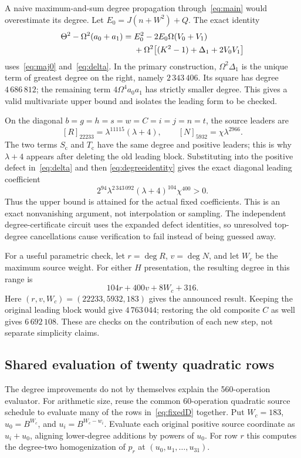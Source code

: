 \documentclass[11pt]{article}
\newcommand{\Sc}{S_{\mathrm c}}
\newcommand{\Tc}{T_{\mathrm c}}
\theoremstyle{remark}\newtheorem{remark}[theorem]{Remark}
\begin{document}
A naive maximum-and-sum degree propagation through~\eqref{eq:main}
would overestimate its degree. Let
$E_0=J(n+W^2)+Q$. The exact identity
\begin{align}
 \Theta^2-\Omega^2(a_0+a_1)
 ={}&E_0^2-2E_0\Omega(V_0+V_1)\notag\\
 &+\Omega^2\bigl[(K^2-1)+\Delta_1+2V_0V_1\bigr]\label{eq:degreeidentity}
\end{align}
uses~\eqref{eq:maj0} and~\eqref{eq:delta}. In the primary construction,
$\Omega^2\Delta_1$ is the unique term of greatest degree on the right,
namely $2\,343\,406$. Its square has degree $4\,686\,812$; the remaining
term $4\Omega^4a_0a_1$ has strictly smaller degree. This gives a valid
multivariate upper bound and isolates the leading form to be checked.

On the diagonal $b=g=h=s=w=C=i=j=n=t$, the source leaders are
\[
 [R]_{22233}=\lambda^{11115}(\lambda+4),\qquad
 [N]_{5932}=\chi\lambda^{2966}.
\]
The two terms $\Sc$ and $\Tc$ have the same degree and positive leaders;
this is why $\lambda+4$ appears after deleting the old leading block.
Substituting into the positive defect in~\eqref{eq:delta} and then
\eqref{eq:degreeidentity} gives the exact diagonal leading coefficient
\begin{equation}\label{eq:leader}
 \boxed{\quad
 2^{94}\lambda^{2\,343\,092}(\lambda+4)^{104}\chi^{400}>0.
 \quad}
\end{equation}
Thus the upper bound is attained for the actual fixed coefficients.
This is an exact nonvanishing argument, not interpolation or sampling.
The independent degree-certificate circuit uses the expanded defect
identities, so unresolved top-degree cancellations cause verification to
fail instead of being guessed away.

For a useful parametric check, let $r=\deg R$, $v=\deg N$, and let $W_c$
be the maximum source weight. For either $H$ presentation, the resulting
degree in this range is
\[
 104r+400v+8W_c+316.
\]
Here $(r,v,W_c)=(22233,5932,183)$ gives the announced result.
Keeping the original leading block would give $4\,763\,044$; restoring
the old composite $C$ as well gives $6\,692\,108$. These are checks on
the contribution of each new step, not separate simplicity claims.

\subsection{Shared evaluation of twenty quadratic rows}

The degree improvements do not by themselves explain the 560-operation
evaluator. For arithmetic size, reuse the common 60-operation quadratic
source schedule to evaluate many of the rows in~\eqref{eq:fixedD}
together. Put $W_c=183$, $u_0=B^{W_c}$, and $u_i=B^{W_c-w_i}$.
Evaluate each original positive source coordinate as $u_i+u_0$, aligning
lower-degree additions by powers of $u_0$. For row $r$ this computes the
degree-two homogenization of $p_r$ at $(u_0,u_1,\ldots,u_{31})$.
\end{document}
